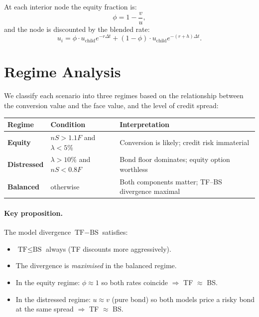 \documentclass[11pt, a4paper]{article}
\begin{document}
At each interior node the equity fraction is:
\begin{equation}
  \phi = 1 - \frac{v}{u},
\end{equation}
and the node is discounted by the blended rate:
\begin{equation}
  u_i = \phi \cdot u_{\text{child}} e^{-r\Delta t}
       + (1-\phi) \cdot u_{\text{child}} e^{-(r+h)\Delta t}.
\end{equation}

\section{Regime Analysis}

We classify each scenario into three regimes based on the relationship
between the conversion value and the face value, and the level of
credit spread:

\begin{center}
\begin{tabular}{lll}
\toprule
Regime & Condition & Interpretation \\
\midrule
\textbf{Equity} & $nS > 1.1F$ and $\lambda < 5\%$ &
  Conversion is likely; credit risk immaterial \\
\textbf{Distressed} & $\lambda > 10\%$ and $nS < 0.8F$ &
  Bond floor dominates; equity option worthless \\
\textbf{Balanced} & otherwise &
  Both components matter; TF--BS divergence maximal \\
\bottomrule
\end{tabular}
\end{center}

\paragraph{Key proposition.}
The model divergence $\text{TF} - \text{BS}$ satisfies:
\begin{itemize}
  \item $\text{TF} \le \text{BS}$ always (TF discounts more aggressively).
  \item The divergence is \emph{maximised} in the balanced regime.
  \item In the equity regime: $\phi \approx 1$ so both rates coincide $\Rightarrow$ TF $\approx$ BS.
  \item In the distressed regime: $u \approx v$ (pure bond) so both models price a risky bond
    at the same spread $\Rightarrow$ TF $\approx$ BS.
\end{itemize}
\end{document}
